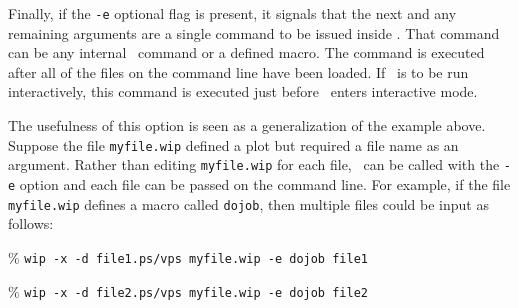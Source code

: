 Finally, if the {\tt -e} optional flag is present, it signals that the
next and any remaining arguments are a single command to be issued inside \wip.
That command can be any internal \wip\ command or a defined macro.
The command is executed after all of the files on the command line have
been loaded.
If \wip\ is to be run interactively, this command is executed just
before \wip\ enters interactive mode.

The usefulness of this option is seen as a generalization of the example
above.
Suppose the file {\tt myfile.wip} defined a plot but required a file
name as an argument.
Rather than editing {\tt myfile.wip} for each file, \wip\ can be called
with the {\tt -e} option and each file can be passed on the command line.
For example, if the file {\tt myfile.wip} defines a macro called
{\tt dojob}, then multiple files could be input as follows:
\begin{wiplist}%
  \item [\%] {\tt wip -x -d file1.ps/vps myfile.wip -e dojob file1}
  \item [\%] {\tt wip -x -d file2.ps/vps myfile.wip -e dojob file2}
\end{wiplist}
